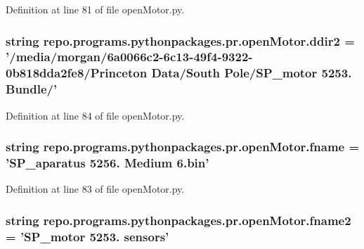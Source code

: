 Definition at line 81 of file open\-Motor.\-py.

\hypertarget{namespacerepo_1_1programs_1_1pythonpackages_1_1pr_1_1openMotor_a7845f46665131b51ba25ba3adfaf4958}{
\subsubsection[{ddir2}]{\setlength{\rightskip}{0pt plus 5cm}string repo.\-programs.\-pythonpackages.\-pr.\-open\-Motor.\-ddir2 = '/media/morgan/6a0066c2-\/6c13-\/49f4-\/9322-\/0b818dda2fe8/\-Princeton Data/\-South Pole/\-S\-P\-\_\-motor 5253. Bundle/'}}\label{namespacerepo_1_1programs_1_1pythonpackages_1_1pr_1_1openMotor_a7845f46665131b51ba25ba3adfaf4958}


Definition at line 84 of file open\-Motor.\-py.

\hypertarget{namespacerepo_1_1programs_1_1pythonpackages_1_1pr_1_1openMotor_a1ca6afbef052898575edbdf81a19cce4}{
\subsubsection[{fname}]{\setlength{\rightskip}{0pt plus 5cm}string repo.\-programs.\-pythonpackages.\-pr.\-open\-Motor.\-fname = 'S\-P\-\_\-aparatus 5256. Medium 6.bin'}}\label{namespacerepo_1_1programs_1_1pythonpackages_1_1pr_1_1openMotor_a1ca6afbef052898575edbdf81a19cce4}


Definition at line 83 of file open\-Motor.\-py.

\hypertarget{namespacerepo_1_1programs_1_1pythonpackages_1_1pr_1_1openMotor_ab3194f8b875a45048365db97cf0d0fd0}{
\subsubsection[{fname2}]{\setlength{\rightskip}{0pt plus 5cm}string repo.\-programs.\-pythonpackages.\-pr.\-open\-Motor.\-fname2 = 'S\-P\-\_\-motor 5253. sensors'}}\label{namespacerepo_1_1programs_1_1pythonpackages_1_1pr_1_1openMotor_ab3194f8b875a45048365db97cf0d0fd0}


